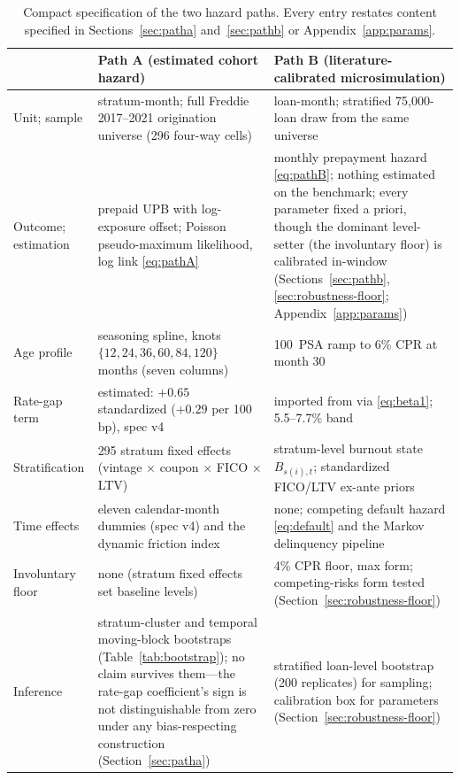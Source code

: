 \documentclass[12pt]{article}
\begin{document}
\begin{table}[H]
\centering
\caption{Compact specification of the two hazard paths. Every entry restates
content specified in Sections~\ref{sec:patha} and~\ref{sec:pathb} or
Appendix~\ref{app:params}.}
\label{tab:specbox}
\footnotesize
\begin{threeparttable}
\begin{tabular}{@{}p{2.2cm}p{5.9cm}p{5.9cm}@{}}
\toprule
 & Path A (estimated cohort hazard) & Path B (literature-calibrated microsimulation) \\
\midrule
Unit; sample & stratum-month; full Freddie 2017--2021 origination universe (296 four-way cells) & loan-month; stratified 75{,}000-loan draw from the same universe \\
Outcome; estimation & prepaid UPB with log-exposure offset; Poisson pseudo-maximum likelihood, log link \eqref{eq:pathA} & monthly prepayment hazard \eqref{eq:pathB}; nothing estimated on the benchmark; every parameter fixed a priori, though the dominant level-setter (the involuntary floor) is calibrated in-window (Sections~\ref{sec:pathb}, \ref{sec:robustness-floor}; Appendix~\ref{app:params}) \\
Age profile & seasoning spline, knots $\{12,24,36,60,84,120\}$ months (seven columns) & 100~PSA ramp to 6\% CPR at month 30 \\
Rate-gap term & estimated: $+0.65$ standardized ($+0.29$ per 100 bp), spec v4 & imported from \citet{liebersohn2024} via \eqref{eq:beta1}; 5.5--7.7\% band \\
Stratification & 295 stratum fixed effects (vintage $\times$ coupon $\times$ FICO $\times$ LTV) & stratum-level burnout state $B_{s(i),t}$; standardized FICO/LTV ex-ante priors \\
Time effects & eleven calendar-month dummies (spec v4) and the dynamic friction index & none; competing default hazard \eqref{eq:default} and the Markov delinquency pipeline \\
Involuntary floor & none (stratum fixed effects set baseline levels) & 4\% CPR floor, max form; competing-risks form tested (Section~\ref{sec:robustness-floor}) \\
Inference & stratum-cluster and temporal moving-block bootstraps (Table~\ref{tab:bootstrap}); no claim survives them---the rate-gap coefficient's sign is not distinguishable from zero under any bias-respecting construction (Section~\ref{sec:patha}) & stratified loan-level bootstrap (200 replicates) for sampling; calibration box for parameters (Section~\ref{sec:robustness-floor}) \\

\end{tabular}
\end{threeparttable}
\end{table}
\end{document}
